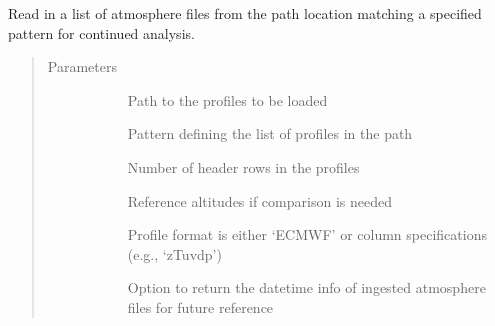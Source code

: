 \documentclass[letterpaper,10pt,english]{sphinxmanual}
\begin{document}
\begin{fulllineitems}
\label{\detokenize{stochprop.eofs:stochprop.eofs.build_atmo_matrix}}
\sphinxAtStartPar
Read in a list of atmosphere files from the path location
matching a specified pattern for continued analysis.
\begin{quote}\begin{description}
\item[{Parameters}] \leavevmode\begin{description}
\item[{}] \leavevmode
\sphinxAtStartPar
Path to the profiles to be loaded

\item[{}] \leavevmode
\sphinxAtStartPar
Pattern defining the list of profiles in the path

\item[{}] \leavevmode
\sphinxAtStartPar
Number of header rows in the profiles

\item[{}] \leavevmode
\sphinxAtStartPar
Reference altitudes if comparison is needed

\item[{}] \leavevmode
\sphinxAtStartPar
Profile format is either ‘ECMWF’ or column specifications (e.g., ‘zTuvdp’)

\item[{}] \leavevmode
\sphinxAtStartPar
Option to return the datetime info of ingested atmosphere files for future reference


\end{description}
\end{description}
\end{quote}
\end{fulllineitems}
\end{document}
